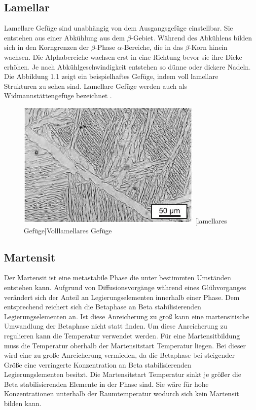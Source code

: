 \documentclass[a4paper, 11pt]{tubsreprt}
\begin{document}
\subsection{Lamellar}
Lamellare Gefüge sind unabhängig von dem Ausgangsgefüge einstellbar. Sie entstehen aus einer Abkühlung aus dem $\beta$-Gebiet. Während des Abkühlens bilden sich in den Korngrenzen der $\beta$-Phase $\alpha$-Bereiche, die in das $\beta$-Korn hinein wachsen. Die Alphabereiche wachsen erst in eine Richtung bevor sie ihre Dicke erhöhen. Je nach Abkühlgeschwindigkeit entstehen so dünne oder dickere Nadeln. Die Abbildung 1.1 zeigt ein beispielhaftes Gefüge, indem voll lamellare Strukturen zu sehen sind. Lamellare Gefüge werden auch als Widmannstättengefüge bezeichnet \cite{Luetjering2007}.


\begin{figure}


	\centering
		\includegraphics[scale=1]{Bilder/lamellar.jpg}
		[lamellares Gefüge]{Volllamellares Gefüge \cite{Leyens2002}}
		\label{lamellar}
		
\end{figure}
\subsection{Martensit}
Der Martensit ist eine metastabile Phase die unter bestimmten Umständen entstehen kann. Aufgrund von Diffusionsvorgänge während eines Glühvorganges verändert sich der Anteil an Legierungselementen innerhalb einer Phase. Dem entsprechend reichert sich die Betaphase an Beta stabilisierenden Legierungselementen an. Ist diese Anreicherung zu groß kann eine martensitische Umwandlung der Betaphase nicht statt finden. Um diese Anreicherung zu regulieren kann die Temperatur verwendet werden. Für eine Martensitbildung muss die Temperatur oberhalb der Martensitstart Temperatur liegen. Bei dieser wird eine zu große Anreicherung vermieden, da die Betaphase bei steigender Größe eine verringerte Konzentration an Beta stabilisierenden Legierungslementen besitzt. Die Martensitstart Temperatur sinkt je größer die Beta stabilisierenden Elemente in der Phase sind. Sie wäre für hohe Konzentrationen unterhalb der Raumtemperatur wodurch sich kein Martensit bilden kann.
\end{document}
